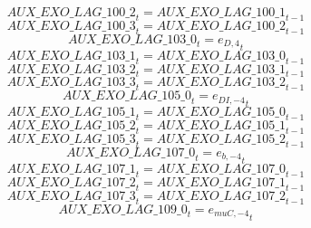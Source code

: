 \begin{dmath}
{AUX\_EXO\_LAG\_100\_2}_{t}={AUX\_EXO\_LAG\_100\_1}_{t-1}
\end{dmath}
\begin{dmath}
{AUX\_EXO\_LAG\_100\_3}_{t}={AUX\_EXO\_LAG\_100\_2}_{t-1}
\end{dmath}
\begin{dmath}
{AUX\_EXO\_LAG\_103\_0}_{t}={{e_{D,4}}}_{t}
\end{dmath}
\begin{dmath}
{AUX\_EXO\_LAG\_103\_1}_{t}={AUX\_EXO\_LAG\_103\_0}_{t-1}
\end{dmath}
\begin{dmath}
{AUX\_EXO\_LAG\_103\_2}_{t}={AUX\_EXO\_LAG\_103\_1}_{t-1}
\end{dmath}
\begin{dmath}
{AUX\_EXO\_LAG\_103\_3}_{t}={AUX\_EXO\_LAG\_103\_2}_{t-1}
\end{dmath}
\begin{dmath}
{AUX\_EXO\_LAG\_105\_0}_{t}={{e_{DI,-4}}}_{t}
\end{dmath}
\begin{dmath}
{AUX\_EXO\_LAG\_105\_1}_{t}={AUX\_EXO\_LAG\_105\_0}_{t-1}
\end{dmath}
\begin{dmath}
{AUX\_EXO\_LAG\_105\_2}_{t}={AUX\_EXO\_LAG\_105\_1}_{t-1}
\end{dmath}
\begin{dmath}
{AUX\_EXO\_LAG\_105\_3}_{t}={AUX\_EXO\_LAG\_105\_2}_{t-1}
\end{dmath}
\begin{dmath}
{AUX\_EXO\_LAG\_107\_0}_{t}={{e_{b,-4}}}_{t}
\end{dmath}
\begin{dmath}
{AUX\_EXO\_LAG\_107\_1}_{t}={AUX\_EXO\_LAG\_107\_0}_{t-1}
\end{dmath}
\begin{dmath}
{AUX\_EXO\_LAG\_107\_2}_{t}={AUX\_EXO\_LAG\_107\_1}_{t-1}
\end{dmath}
\begin{dmath}
{AUX\_EXO\_LAG\_107\_3}_{t}={AUX\_EXO\_LAG\_107\_2}_{t-1}
\end{dmath}
\begin{dmath}
{AUX\_EXO\_LAG\_109\_0}_{t}={{e_{muC,-4}}}_{t}
\end{dmath}
